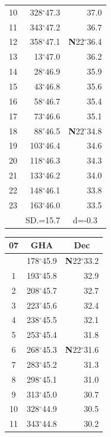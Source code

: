 \documentclass[10pt, a4paper]{report}
\begin{document}
\begin{scriptsize}
\begin{tabular*}{0.2\textwidth}[t]{@{\extracolsep{\fill}}|c|rr|}
10 & 328$^\circ$47.3 & 37.0\\
11 & 343$^\circ$47.2 & 36.7\\[2Pt]
12 & 358$^\circ$47.1 & \textbf{N}22$^\circ$36.4\\
13 & 13$^\circ$47.0 & 36.2\\
14 & 28$^\circ$46.9 & 35.9\\
15 & 43$^\circ$46.8 & \raisebox{0.24ex}{\boldmath$\cdot$~\boldmath$\cdot$~~}35.6\\
16 & 58$^\circ$46.7 & 35.4\\
17 & 73$^\circ$46.6 & 35.1\\[2Pt]
18 & 88$^\circ$46.5 & \textbf{N}22$^\circ$34.8\\
19 & 103$^\circ$46.4 & 34.6\\
20 & 118$^\circ$46.3 & 34.3\\
21 & 133$^\circ$46.2 & \raisebox{0.24ex}{\boldmath$\cdot$~\boldmath$\cdot$~~}34.0\\
22 & 148$^\circ$46.1 & 33.8\\
23 & 163$^\circ$46.0 & 33.5\\
\hline
\rule{0pt}{2.4ex} & \multicolumn{1}{c}{SD.=15.7} & \multicolumn{1}{c|}{d=-0.3}\\
\hline
\end{tabular*}\noindent
\begin{tabular*}{0.2\textwidth}[t]{@{\extracolsep{\fill}}|c|rr|}
\hline
\multicolumn{1}{|c|}{\rule{0pt}{2.6ex}\textbf{07}} & \multicolumn{1}{c}{\textbf{GHA}} & \multicolumn{1}{c|}{\textbf{Dec}}\\
\hline\rule{0pt}{2.6ex}\noindent
0 & 178$^\circ$45.9 & \textbf{N}22$^\circ$33.2\\
1 & 193$^\circ$45.8 & 32.9\\
2 & 208$^\circ$45.7 & 32.7\\
3 & 223$^\circ$45.6 & \raisebox{0.24ex}{\boldmath$\cdot$~\boldmath$\cdot$~~}32.4\\
4 & 238$^\circ$45.5 & 32.1\\
5 & 253$^\circ$45.4 & 31.8\\[2Pt]
6 & 268$^\circ$45.3 & \textbf{N}22$^\circ$31.6\\
7 & 283$^\circ$45.2 & 31.3\\
8 & 298$^\circ$45.1 & 31.0\\
9 & 313$^\circ$45.0 & \raisebox{0.24ex}{\boldmath$\cdot$~\boldmath$\cdot$~~}30.7\\
10 & 328$^\circ$44.9 & 30.5\\
11 & 343$^\circ$44.8 & 30.2\\[2Pt]

\end{tabular*}
\end{scriptsize}
\end{document}
